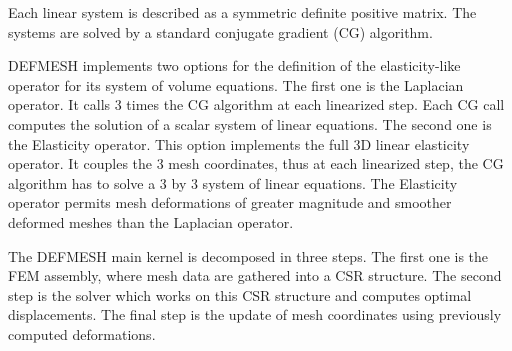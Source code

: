 \documentclass[10pt]{IOS-Book-Article}
\begin{document}
Each linear system is described as a symmetric definite positive matrix. The systems are solved by a standard conjugate gradient (CG) algorithm.

DEFMESH implements two options for the definition of the elasticity-like operator for its system of volume equations.
The first one is  the Laplacian operator. It calls 3 times the CG algorithm at each linearized step.  Each CG call computes the solution of a scalar system of linear equations.
The second one is the Elasticity operator. This option implements the full 3D linear elasticity operator.
It couples the 3 mesh coordinates, thus at each linearized step, the CG algorithm has to solve a 3 by 3 system of linear equations.
The Elasticity operator permits mesh deformations of greater magnitude and smoother deformed meshes than the Laplacian operator.

The DEFMESH main kernel is decomposed in three steps.
The first one is the FEM assembly, where mesh data are gathered into a CSR structure.
The second step is the solver which works on this CSR structure and computes optimal displacements.
The final step is the update of mesh coordinates using previously computed deformations.
\end{document}
